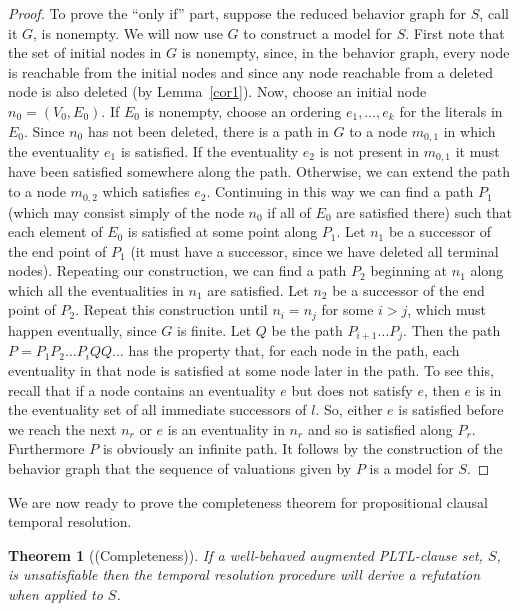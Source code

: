 \documentclass[nohyperref]{acmtrans2f}
\newtheorem{subtheorem}{Theorem}[subsection]
\begin{document}
\begin{proof}
To prove the ``only if'' part, suppose the reduced behavior graph for
$S$, call it $G$, is nonempty. We will now use $G$ to construct a
model for $S$. First note that the set of initial nodes in $G$ is
nonempty, since, in the behavior graph, every node is reachable from the
initial nodes and since any node reachable from a deleted node is also deleted
(by Lemma~\ref{cor1}).
Now, choose an initial node $n_0 = (V_0,E_0)$. If $E_0$ is nonempty,
choose an ordering $e_1, \ldots,e_k$ for the literals in $E_0$. Since
$n_0$ has not been deleted, there is a path in $G$ to a node $m_{0,1}$
in which the eventuality $e_1$ is satisfied. If the eventuality $e_2$
is not present in $m_{0,1}$ it must have been satisfied somewhere
along the path. Otherwise, we can extend the path to a node $m_{0,2}$
which satisfies $e_2$. Continuing in this way we can find a path $P_1$
(which may consist simply of the node $n_0$ if all of $E_0$ are
satisfied there) such that each element of $E_0$ is satisfied at some
point along $P_1$. Let $n_1$ be a successor of the end point of $P_1$
(it must have a successor, since we have deleted all terminal
nodes). Repeating our construction, we can find a path $P_2$ beginning
at $n_1$ along which all the eventualities in $n_1$ are satisfied. Let
$n_2$ be a successor of the end point of $P_2$. Repeat this
construction until $n_i = n_j$ for some $i > j$, which must happen
eventually, since $G$ is finite. Let $Q$ be the path $P_{i+1} \ldots
P_j$. Then the path $P = P_1 P_2 \ldots P_{i} Q Q \ldots$ has the property
that, for each node in the path, each eventuality in that node is
satisfied at some node later in the path. To see this, recall that if
a node contains an eventuality $e$ but does not satisfy $e$, then $e$
is in the eventuality set of all immediate successors of $l$. So,
either $e$ is satisfied before we reach the next $n_r$ or $e$ is an
eventuality in $n_r$ and so is satisfied along $P_r$. Furthermore $P$
is obviously an infinite path. It follows by the construction of the
behavior graph that the sequence of valuations given by $P$ is a
model for $S$.
\end{proof}

\noindent We are now ready to prove the completeness theorem for
propositional clausal temporal resolution.

\begin{subtheorem}[(Completeness)]
If a well-behaved augmented PLTL-clause set, $S$, is unsatisfiable then the
temporal resolution procedure will derive a refutation when applied to
$S$.
\end{subtheorem}
\end{document}
